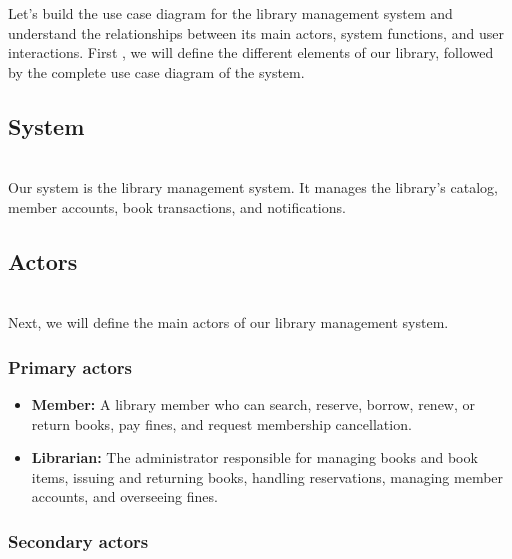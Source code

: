 

Let's build the use case diagram for the library management system and understand the relationships between its main actors, system functions, and user interactions. First , we will define the different elements of our library, followed by the complete use case diagram of the system.

\subsection{System}\label{0ubFJ51N6k4NDPk2NKe6F}
\\
Our system is the library management system. It manages the library's catalog, member accounts, book transactions, and notifications.

\subsection{Actors}\label{xx5ay0GYZD-qjnudajTgv}
\\
Next, we will define the main actors of our library management system.

\subsubsection{Primary actors}\label{rVsk3lbKBYgP6Yg2os4pZ}

\begin{itemize}
\item
\protect{}\label{cXZdpFr7k5QCPcDIdJRwi}
\textbf{Member:} A library member who can search, reserve, borrow, renew, or return books, pay fines, and request membership cancellation.
\item
\protect{}\label{7ewneLUTbIder7qY-FrpB}
\textbf{Librarian:} The administrator responsible for managing books and book items, issuing and returning books, handling reservations, managing member accounts, and overseeing fines.
\end{itemize}

\subsubsection{Secondary actors}\label{Yb9cGDFw2Szq6JwmpEivm}

